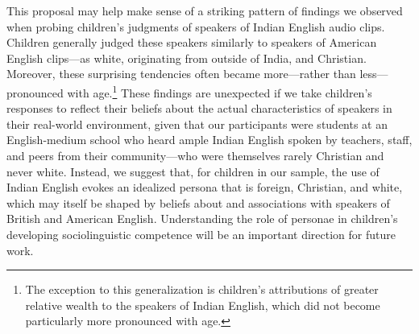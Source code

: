 \documentclass{foushee-adapted-preprint}
\begin{document}
This proposal may help make sense of a striking pattern of findings we observed when probing children's judgments of speakers of Indian English audio clips. Children generally judged these speakers similarly to speakers of American English clips---as white, originating from outside of India, and Christian. Moreover, these surprising tendencies often became more---rather than less---pronounced with age.\footnote{The exception to this generalization is children's attributions of greater relative wealth to the speakers of Indian English, which did not become particularly more pronounced with age.} 
These findings are unexpected if we take children's responses to reflect their beliefs about the actual characteristics of speakers in their real-world environment, given that our participants were students at an English-medium school who heard ample Indian English spoken by teachers, staff, and peers from their community---who were themselves rarely Christian and never white. Instead, we suggest that, for children in our sample, the use of Indian English evokes an idealized persona that is foreign, Christian, and white, which may itself be shaped by beliefs about and associations with speakers of British and American English. %
Understanding the role of personae in children's developing sociolinguistic competence will be an important direction for future work.
\end{document}
